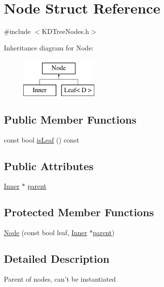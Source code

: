 \hypertarget{structNode}{\section{Node Struct Reference}
\label{structNode}
}


{\ttfamily \#include $<$K\-D\-Tree\-Nodes.\-h$>$}

Inheritance diagram for Node\-:\begin{figure}[H]
\begin{center}
\leavevmode
\includegraphics[height=2.000000cm]{structNode}
\end{center}
\end{figure}
\subsection*{Public Member Functions}
\begin{DoxyCompactItemize}
\item 
const bool \hyperlink{structNode_a1d4f6e4b2b8ff2c149210cfaf95b817d}{is\-Leaf} () const 
\end{DoxyCompactItemize}
\subsection*{Public Attributes}
\begin{DoxyCompactItemize}
\item 
\hyperlink{structInner}{Inner} $\ast$ \hyperlink{structNode_a44c2ed507b369efa2c74549d9b862c9b}{parent}
\end{DoxyCompactItemize}
\subsection*{Protected Member Functions}
\begin{DoxyCompactItemize}
\item 
\hyperlink{structNode_a056107855260daf5f707c14fd85eb7b7}{Node} (const bool leaf, \hyperlink{structInner}{Inner} $\ast$\hyperlink{structNode_a44c2ed507b369efa2c74549d9b862c9b}{parent})
\end{DoxyCompactItemize}


\subsection{Detailed Description}
Parent of nodes, can't be instantiated 

